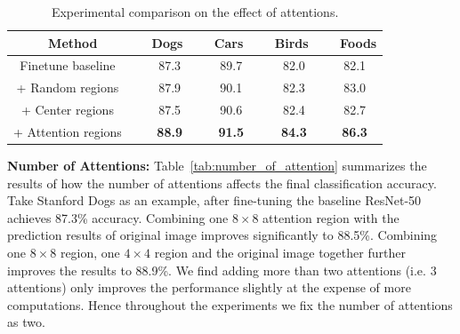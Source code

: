 \documentclass[10pt,twocolumn,letterpaper]{article}
\begin{document}
\begin{table}[t]
\centering
{}
\addtolength{\tabcolsep}{2.5pt}
\begin{tabular}{c c c c c}
\toprule[0.2 em]
Method & \ Dogs \ & \ Cars \ & \ Birds \ & \ Foods \\
\toprule[0.2 em]
Finetune baseline \ & 87.3 & 89.7 & 82.0 & 82.1\\
+ Random regions \ & 87.9 & 90.1 & 82.3 & 83.0 \\
+ Center regions \ & 87.5 & 90.6 & 82.4 & 82.7 \\
+ Attention regions \ & \bf{88.9} & \bf{91.5} & \bf{84.3} & \bf{86.3} \\
\bottomrule[0.1 em]
\end{tabular}
\vspace{1pt}
\caption{Experimental comparison on the effect of attentions.}
\label{tab:effect_of_attention}
\end{table}

\textbf{Number of Attentions:}
Table~\ref{tab:number_of_attention} summarizes the results of how the number of attentions affects the final classification accuracy.
Take Stanford Dogs as an example, after fine-tuning the baseline ResNet-50 achieves 87.3\% accuracy.
Combining one $8\times8$ attention region with the prediction results of original image improves significantly to 88.5\%.
Combining one $8\times8$ region, one $4\times4$ region and the original image together further improves the results to 88.9\%.
We find adding more than two attentions (i.e. 3 attentions) only improves the performance slightly at the expense of more computations.
Hence throughout the experiments we fix the number of attentions as two.
\end{document}
